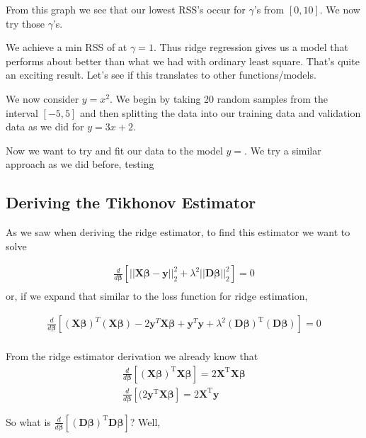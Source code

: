 \documentclass{article}
\newcommand{\y}{\mathbf{y}}
\newcommand{\X}{\mathbf{X}}
\newcommand{\B}{\boldsymbol\beta} %
\newcommand{\D}{\mathbf{D}}
\begin{document}
From this graph we see that our lowest RSS's occur for $\gamma$'s from $[0,10]$. We now try those $\gamma$'s. 

We achieve a min RSS of at $\gamma = 1$. Thus ridge regression gives us a model that performs about %
better than what we had with ordinary least square. That's quite an exciting result. Let's see if this translates to other functions/models.


We now consider $y = x^2$. We begin by taking 20 random samples from the interval $[-5,5]$ and then splitting the data into our training data and validation
data as we did for $y = 3x + 2$. 

Now we want to try and fit our data to the model $y = $. We try a similar approach as we did before, testing 
\subsection{Deriving the Tikhonov Estimator}

As we saw when deriving the ridge estimator, to find this estimator we want to solve

\begin{align*}
\frac{d}{d\B} \left[ ||\X\B-\y||_{2}^{2} + \lambda^2||\D \B||_{2}^{2} \right] = 0 \\
\end{align*}
or, if we expand that similar to the loss function for ridge estimation, 

\begin{align*}
\frac{d}{d\B} \left[ (\X\B)^T(\X\B) -2 \y^T \X\B + \y^T \y + \lambda^2(\D\B)^{\textrm{T}}(\D\B) \right] = 0 \\
\end{align*}

From the ridge estimator derivation we already know that 
\begin{align*}
\frac{d}{d\B} [ (\X\B)^{\textrm{T}} \X\B ] = 2\X^{\textrm{T}}\X\B \\
\frac{d}{d\B} [ (2\y^{\textrm{T}} \X\B ] = 2\X^{\textrm{T}}\y
\end{align*}

So what is $\frac{d}{d\B} [ (\D\B)^{\textrm{T}}\D\B ] $? Well, 
\end{document}

